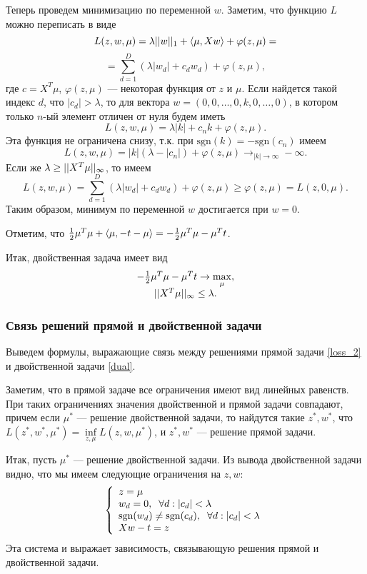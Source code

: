 \documentclass[12pt]{article}
\begin{document}
		Теперь проведем минимизацию по переменной $w$. Заметим, что функцию $L$ можно переписать в виде 
		$$L(z, w, \mu) = \lambda ||w||_1 + \langle \mu, Xw \rangle + \varphi(z, \mu) = $$
		$$ = \sum_{d = 1}^D (\lambda |w_d| + c_d w_d) + \varphi(z, \mu),$$
		где $c = X^T \mu$, $\varphi(z, \mu)$ — некоторая функция от $z$ и $\mu$. Если найдется такой индекс $d$, что $|c_d| > \lambda$, то для вектора $w = (0, 0, \ldots, 0, k, 0, \ldots, 0)$, в котором только $n$-ый элемент отличен от нуля будем иметь
		$$L(z, w, \mu) = \lambda |k| + c_n k + \varphi(z, \mu).$$
		Эта функция не ограничена снизу, т.к. при $\mbox{sgn}(k) = -\mbox{sgn}(c_n)$ имеем
		$$L(z, w, \mu) = |k|(\lambda - |c_n|) + \varphi(z, \mu) \longrightarrow_{|k| \rightarrow \infty} -\infty.$$
		Если же $\lambda \ge ||X^T \mu||_\infty$, то имеем 
		$$L(z, w, \mu) = \sum_{d = 1}^D (\lambda |w_d| + c_d w_d) + \varphi(z, \mu) \ge \varphi(z, \mu) = L(z, 0, \mu).$$
		Таким образом, минимум по переменной $w$ достигается при $w = 0$. 
		
		Отметим, что $\frac 1 2 \mu^T \mu + \langle \mu, -t - \mu \rangle = - \frac 1 2 \mu^T \mu - \mu^T t$.
		
		Итак, двойственная задача имеет вид
		\begin{equation}\label{dual}
			\begin{array}[l]{c}
			- \frac 1 2 \mu^T \mu - \mu^T t \rightarrow \max\limits_{\mu},\\
			\norm{X^T \mu}_\infty \le \lambda.
			\end{array}
		\end{equation}
	
	\subsubsection{Связь решений прямой и двойственной задачи}
	
		Выведем формулы, выражающие связь между решениями прямой задачи \ref{loss_2} и двойственной задачи \ref{dual}.
		
		Заметим, что в прямой задаче все ограничения имеют вид линейных равенств. При таких ограничениях значения двойственной и прямой задачи совпадают, причем если $\mu^*$ — решение двойственной задачи, то найдутся такие $z^*, w^*$, что $L(z^*, w^*, \mu^*) = \inf\limits_{z, \mu} L(z, w, \mu^*)$, и $z^*, w^*$ — решение прямой задачи.
		
		Итак, пусть $\mu^*$ — решение двойственной задачи. Из вывода двойственной задачи видно, что мы имеем следующие ограничения на $z, w$:
		\begin{equation}\label{primaldualvariables}
		\left \{ \begin{array}[l]{l}
		z = \mu \\
		w_d = 0, \hspace{0.2cm}\forall d : |c_d| < \lambda\\
		\sgn(w_d) \ne \sgn(c_d), \hspace{0.2cm} \forall d : |c_d| < \lambda\\
		Xw - t = z
		\end{array}
		\right.
		\end{equation}
	Эта система и выражает зависимость, связывающую решения прямой и двойственной задачи.
	
\end{document}
